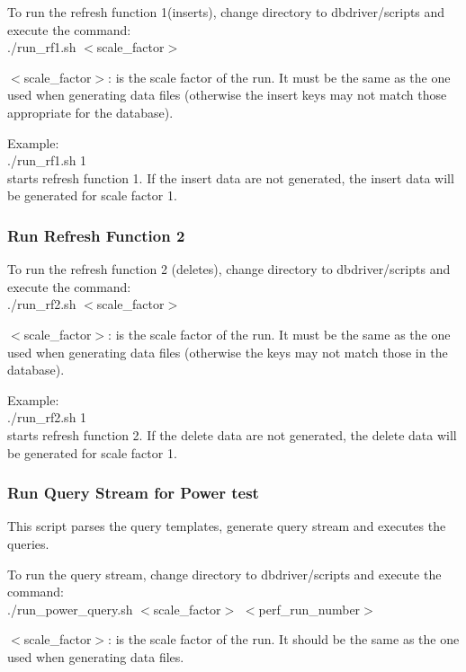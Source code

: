 \documentclass{article}
\begin{document}
\noindent
To run the refresh function 1(inserts), change directory to
dbdriver/scripts and execute the command: \\
\indent ./run\_rf1.sh  $<$scale\_factor$>$ 

\noindent
$<$scale\_factor$>$: is the scale factor of the run.  It must be the same
as the one used when generating data files (otherwise the insert keys
may not match those appropriate for the database).

\noindent
Example: \\
\indent ./run\_rf1.sh 1 \\
\indent starts refresh function 1.  If the insert data are not generated,  the insert data will be generated for scale factor 1.  

\subsubsection{Run Refresh Function 2}

\noindent
To run the refresh function 2 (deletes), change directory to
dbdriver/scripts and execute the command: \\
\indent ./run\_rf2.sh  $<$scale\_factor$>$ 

\noindent
$<$scale\_factor$>$: is the scale factor of the run.  It must be the same
as the one used when generating data files (otherwise the keys may
not match those in the database).

\noindent
Example: \\
\indent ./run\_rf2.sh 1 \\
\indent starts refresh function 2.  If the delete data are not generated,  the delete data will be generated for scale factor 1.

\subsubsection{Run Query Stream for Power test}

\noindent
This script parses the query templates, generate query stream and
executes the queries.

\noindent
To run the query stream, change directory to dbdriver/scripts and
execute the command: \\
\indent ./run\_power\_query.sh  $<$scale\_factor$>$ $<$perf\_run\_number$>$ 

\noindent
$<$scale\_factor$>$: is the scale factor of the run.  It should be the same
as the one used when generating data files.
\end{document}
